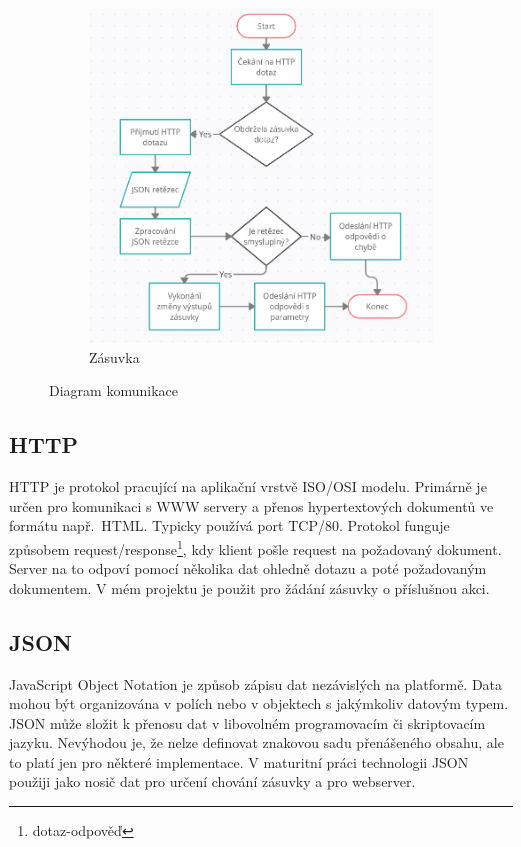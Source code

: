 \documentclass[a4paper, 12pt]{report}
\begin{document}
\begin{figure}[h!]
\begin{subfigure}[b]{0.49\linewidth}
            \includegraphics[width=\linewidth]{images/blokove schema zasuvka}
            \caption{Zásuvka}
        \end{subfigure}
        \caption{Diagram komunikace}
        \label{fig:diagram}
    \end{figure}

    \subsection{HTTP}
    HTTP je protokol pracující na aplikační vrstvě ISO/OSI modelu.
    Primárně je určen pro komunikaci s WWW servery a přenos hypertextových dokumentů ve formátu např.~HTML\@.
    Typicky používá port TCP/80.
    Protokol funguje způsobem request/response\footnote{dotaz-odpověď}, kdy klient pošle request na požadovaný dokument.
    Server na to odpoví pomocí několika dat ohledně dotazu a poté požadovaným dokumentem.
    V mém projektu je použit pro žádání zásuvky o příslušnou akci.

    \subsection{JSON}
    JavaScript Object Notation je způsob zápisu dat nezávislých na platformě.
    Data mohou být organizována v polích nebo v objektech s jakýmkoliv datovým typem.
    JSON může složit k přenosu dat v libovolném programovacím či skriptovacím jazyku.
    Nevýhodou je, že nelze definovat znakovou sadu přenášeného obsahu, ale to platí jen pro některé implementace.
    V maturitní práci technologii JSON použiji jako nosič dat pro určení chování zásuvky a pro webserver.
\end{document}

